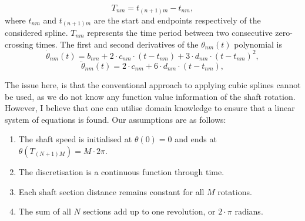 \documentclass{article}
\begin{document}
	\begin{equation}
		T_{nm} = t_{(n + 1)m} - t_{nm},
	\end{equation}
	where $t_{nm}$ and $t_{(n + 1)m}$ are the start and endpoints respectively of the considered spline. $T_{nm}$ represents the time period between two consecutive zero-crossing times. The first and second derivatives of the $\theta_{nm}(t)$ polynomial is
	\begin{equation}
		\dot{\theta}_{nm}(t) = b_{nm} + 2 \cdot c_{nm} \cdot \left(t - t_{nm} \right) + 3 \cdot d_{nm} \cdot \left( t - t_{nm}\right)^2,
	\end{equation}
	\begin{equation}
		\ddot{\theta}_{nm}(t) = 2 \cdot c_{nm} + 6 \cdot d_{nm} \cdot \left( t - t_{nm}\right),
	\end{equation}
	
	The issue here, is that the conventional approach to applying cubic splines cannot be used, as we do not know any function value information of the shaft rotation. However, I believe that one can utilise domain knowledge to ensure that a linear system of equations is found. Our assumptions are as follows:
	\begin{enumerate}
		\item The shaft speed is initialised at $\theta(0) = 0$ and ends at $\theta(T_{(N + 1)M}) = M \cdot 2 \pi$.
		\item The discretisation is a continuous function through time.
		\item Each shaft section distance remains constant for all $M$ rotations.
		\item The sum of all $N$ sections add up to one revolution, or $2\cdot\pi$ radians.
	\end{enumerate}
\end{document}
